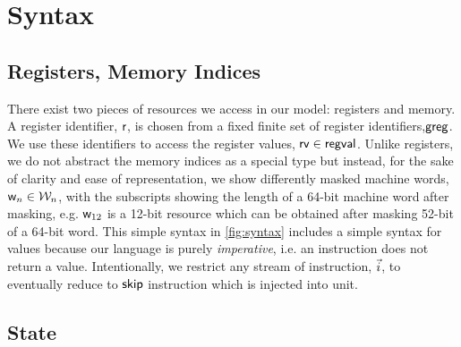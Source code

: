 \section{Syntax}
\label{sec:syntax}
\subsection{Registers, Memory Indices}
There exist two pieces of resources we access in our model: registers and memory. A register identifier, $\mathsf{r}$, is chosen from a fixed finite set of register identifiers,$\mathsf{greg}$. We use these identifiers to access the register values, $\mathsf{rv} \in \mathsf{regval}$. Unlike registers, we do not abstract the memory indices as a special type but instead, for the sake of clarity and ease of representation, we show differently masked machine words, $\mathsf{w}_n \in \mathcal{W}_n$, with the subscripts showing the length of a 64-bit machine word after masking, e.g. $\mathsf{w}_{12}$ is a 12-bit resource which can be obtained after masking 52-bit of a 64-bit word.
This simple syntax in \ref{fig:syntax} includes a simple syntax for values because our language is purely \textit{imperative}, i.e. an instruction does not return a value. Intentionally, we restrict any stream of instruction, $\vec{i}$, to eventually reduce to $\mathsf{skip}$ instruction which is injected into unit.

\subsection{State}
\label{state}
